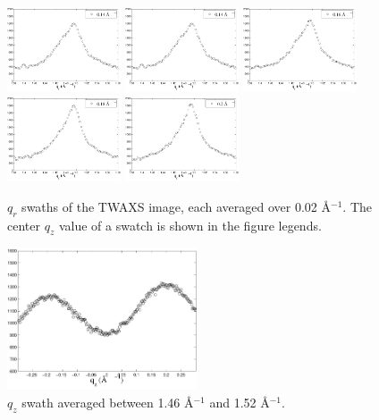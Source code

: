 \begin{figure}[htbp]
  \includegraphics[width=0.3\textwidth]{figures/ripple/TWAXS/twaxs_qrplot9}
  \includegraphics[width=0.3\textwidth]{figures/ripple/TWAXS/twaxs_qrplot9}
  \includegraphics[width=0.3\textwidth]{figures/ripple/TWAXS/twaxs_qrplot10}
  \includegraphics[width=0.3\textwidth]{figures/ripple/TWAXS/twaxs_qrplot11}
  \includegraphics[width=0.3\textwidth]{figures/ripple/TWAXS/twaxs_qrplot12}
  \caption{$q_r$ swaths of the TWAXS image, each averaged over 0.02 \AA$^{-1}$. 
  The center $q_z$ value of a swatch is shown in the figure legends.}
  \label{fig:twaxs_qrplots}
\end{figure}

\begin{figure}[htbp]
  \centering
  \includegraphics[width=0.5\textwidth]{figures/ripple/TWAXS/twaxs_qzplot}
  \caption{$q_z$ swath averaged between 1.46 \AA$^{-1}$ and 1.52 \AA$^{-1}$.}
  \label{fig:twaxs_qzplot}
\end{figure}  
  
